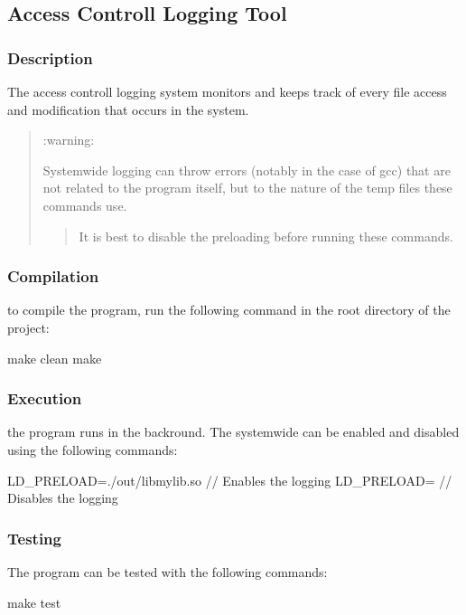 \subsection*{Access Controll Logging Tool}

\subsubsection*{Description}

The access controll logging system monitors and keeps track of every file access and modification that occurs in the system.

\begin{quote}
\+:warning\+:

Systemwide logging can throw errors (notably in the case of \textquotesingle{}gcc\textquotesingle{}) that are not related to the program itself, but to the nature of the temp files these commands use.

\begin{quote}


It is best to disable the preloading before running these commands. \end{quote}
\end{quote}


\subsubsection*{Compilation}

to compile the program, run the following command in the root directory of the project\+:


\begin{DoxyCode}
make clean
make
\end{DoxyCode}


\subsubsection*{Execution}

the program runs in the backround. The systemwide can be enabled and disabled using the following commands\+:


\begin{DoxyCode}
LD\_PRELOAD=./out/libmylib.so    // Enables the logging
LD\_PRELOAD=                     // Disables the logging
\end{DoxyCode}


\subsubsection*{Testing}

The program can be tested with the following commands\+:


\begin{DoxyCode}
make test
\end{DoxyCode}
 